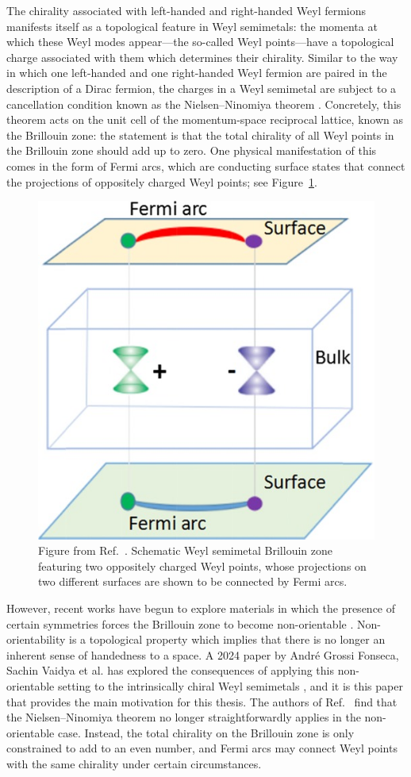The chirality associated with left-handed and right-handed Weyl fermions manifests itself as a topological feature in Weyl semimetals: the momenta at which these Weyl modes appear---the so-called Weyl points---have a topological charge associated with them which determines their chirality. Similar to the way in which one left-handed and one right-handed Weyl fermion are paired in the description of a Dirac fermion, the charges in a Weyl semimetal are subject to a cancellation condition known as the Nielsen--Ninomiya theorem \cite{NielsenNinomiya_I,NielsenNinomiya_II}. Concretely, this theorem acts on the unit cell of the momentum-space reciprocal lattice, known as the Brillouin zone: the statement is that the total chirality of all Weyl points in the Brillouin zone should add up to zero. One physical manifestation of this comes in the form of Fermi arcs, which are conducting surface states that connect the projections of oppositely charged Weyl points; see Figure~\ref{fig:fermi-arcs}.
\begin{figure}[htb!]
	\centering
	\includegraphics[width=.5\linewidth]{Images/fermi-arcs}
	\caption{Figure from Ref.~\cite{Chi_WSM}. Schematic Weyl semimetal Brillouin zone featuring two oppositely charged Weyl points, whose projections on two different surfaces are shown to be connected by Fermi arcs.}
	\label{fig:fermi-arcs}
\end{figure}

However, recent works have begun to explore materials in which the presence of certain symmetries forces the Brillouin zone to become non-orientable \cite{CYZ_Klein-gauge,TaoYan_acoustic-Klein,Zhu_acoustic-Klein-halfturn,WangZhang_acoustic-Klein-2D}. Non-orientability is a topological property which implies that there is no longer an inherent sense of handedness to a space. A 2024 paper by André Grossi Fonseca, Sachin Vaidya et al. has explored the consequences of applying this non-orientable setting to the intrinsically chiral Weyl semimetals \cite{Fonseca-Vaidya_nonorientable}, and it is this paper that provides the main motivation for this thesis. The authors of Ref.~\cite{Fonseca-Vaidya_nonorientable} find that the Nielsen--Ninomiya theorem no longer straightforwardly applies in the non-orientable case. Instead, the total chirality on the Brillouin zone is only constrained to add to an even number, and Fermi arcs may connect Weyl points with the same chirality under certain circumstances.

